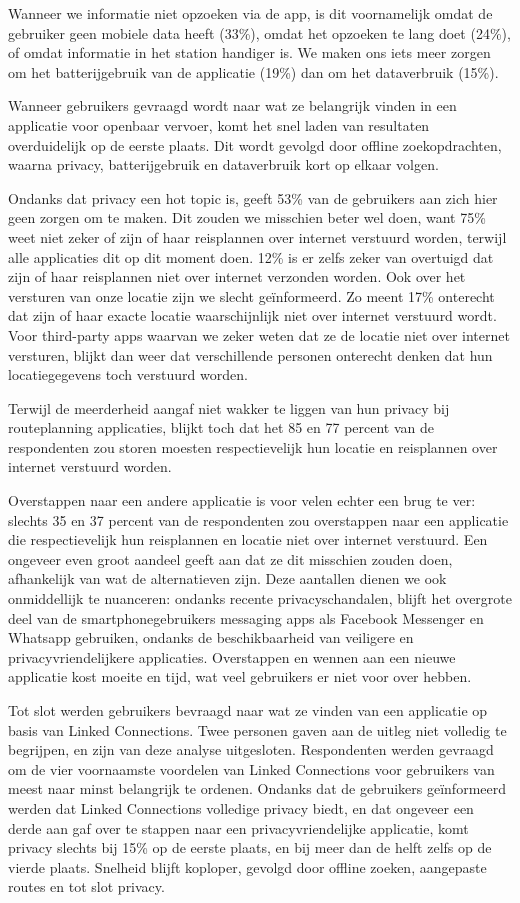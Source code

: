 Wanneer we informatie niet opzoeken via de app, is dit voornamelijk omdat de gebruiker geen mobiele data heeft (33\%), omdat het opzoeken te lang doet (24\%), of omdat informatie in het station handiger is. We maken ons iets meer zorgen om het batterijgebruik van de applicatie (19\%) dan om het dataverbruik (15\%).

Wanneer gebruikers gevraagd wordt naar wat ze belangrijk vinden in een applicatie voor openbaar vervoer, komt het snel laden van resultaten overduidelijk op de eerste plaats. Dit wordt gevolgd door offline zoekopdrachten, waarna privacy, batterijgebruik en dataverbruik kort op elkaar volgen.

Ondanks dat privacy een hot topic is, geeft 53\% van de gebruikers aan zich hier geen zorgen om te maken. Dit zouden we misschien beter wel doen, want 75\% weet niet zeker of zijn of haar reisplannen over internet verstuurd worden, terwijl alle applicaties dit op dit moment doen. 12\% is er zelfs zeker van overtuigd dat zijn of haar reisplannen niet over internet verzonden worden. Ook over het versturen van onze locatie zijn we slecht geïnformeerd. Zo meent 17\% onterecht dat zijn of haar exacte locatie waarschijnlijk niet over internet verstuurd wordt. Voor third-party apps waarvan we zeker weten dat ze de locatie niet over internet versturen, blijkt dan weer dat verschillende personen onterecht denken dat hun locatiegegevens toch verstuurd worden. 

Terwijl de meerderheid aangaf niet wakker te liggen van hun privacy bij routeplanning applicaties, blijkt toch dat het 85 en 77 percent van de respondenten zou storen moesten respectievelijk hun locatie en reisplannen over internet verstuurd worden.
 
Overstappen naar een andere applicatie is voor velen echter een brug te ver: slechts 35 en 37 percent van de respondenten zou overstappen naar een applicatie die respectievelijk hun reisplannen en locatie niet over internet verstuurd. Een ongeveer even groot aandeel geeft aan dat ze dit misschien zouden doen, afhankelijk van wat de alternatieven zijn. Deze aantallen dienen we ook onmiddellijk te nuanceren: ondanks recente privacyschandalen, blijft het overgrote deel van de smartphonegebruikers messaging apps als Facebook Messenger en Whatsapp gebruiken, ondanks de beschikbaarheid van veiligere en privacyvriendelijkere applicaties. Overstappen en wennen aan een nieuwe applicatie kost moeite en tijd, wat veel gebruikers er niet voor over hebben.

Tot slot werden gebruikers bevraagd naar wat ze vinden van een applicatie op basis van Linked Connections. Twee personen gaven aan de uitleg niet volledig te begrijpen, en zijn van deze analyse uitgesloten.
Respondenten werden gevraagd om de vier voornaamste voordelen van Linked Connections voor gebruikers van meest naar minst belangrijk te ordenen. Ondanks dat de gebruikers geïnformeerd werden dat Linked Connections volledige privacy biedt, en dat ongeveer een derde aan gaf over te stappen naar een privacyvriendelijke applicatie, komt privacy slechts bij 15\% op de eerste plaats, en bij meer dan de helft zelfs op de vierde plaats. Snelheid blijft koploper, gevolgd door offline zoeken, aangepaste routes en tot slot privacy.

